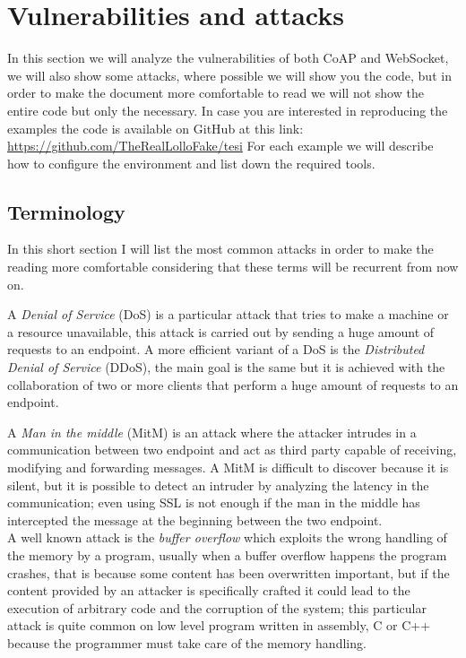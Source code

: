 	\section{Vulnerabilities and attacks}
	In this section we will analyze the vulnerabilities of both CoAP and WebSocket, we will also show some attacks,
	where possible we will show you the code, but in order to make the document more comfortable to read we will not
	show the entire code but only the necessary.\newline
	In case you are interested in reproducing the examples the code is available on GitHub at this link:\\ \url{https://github.com/TheRealLolloFake/tesi}
	For each example we will describe how to configure the environment
	and list down the required tools.\newline
	
	\subsection{Terminology}
	In this short section I will list the most common attacks in order to make the reading more comfortable considering that these terms will be recurrent from now on.\newline
	
	A \emph{Denial of Service} (DoS) is a particular attack that tries to make a machine or a resource unavailable, this
	attack is carried out by sending a huge amount of requests to an endpoint.\newline
	A more efficient variant of a DoS is the \emph{Distributed Denial of Service} (DDoS), the main goal is the same but it is achieved
	with the collaboration of two or more clients that perform a huge amount of requests to an endpoint.\newline
	
	A \emph{Man in the middle} (MitM) is an attack where the attacker intrudes in a communication between two endpoint
	and act as third party capable of receiving, modifying and forwarding messages.\newline
	A MitM is difficult to discover because it is silent, but it is possible to detect an intruder by analyzing
	the latency in the communication; even using SSL is not enough if the man in the middle has intercepted
	the message at the beginning between the two endpoint.\\
	
	
	A well known attack is the \emph{buffer overflow} which exploits the wrong handling of the memory by a program, usually when a buffer
	overflow happens the program crashes, that is because some content has been overwritten important,
	but if the content provided by an attacker is specifically crafted it could lead to the execution of arbitrary code
	and the corruption of the system; this particular attack is quite common on low level program written in assembly, C or C++
	because the programmer must take care of the memory handling.\newline
	

